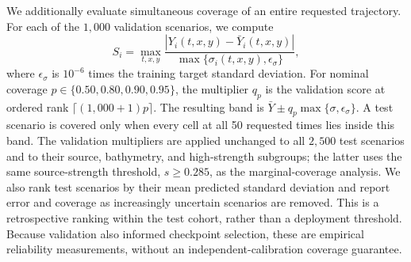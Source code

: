 We additionally evaluate simultaneous coverage of an entire requested trajectory. For each of the $1{,}000$ validation scenarios, we compute
\begin{equation}
S_i = \max_{t, x, y} \frac{|Y_i (t, x, y) - \bar{Y}_i(t, x, y)|}{\max\{\sigma_i(t, x, y), \epsilon_\sigma\}},
\end{equation}
where $\epsilon_\sigma$ is $10 ^ {-6}$ times the training target standard deviation. For nominal coverage $p\in\{0.50, 0.80, 0.90, 0.95\}$, the multiplier $q_p$ is the validation score at ordered rank $\lceil(1{,}000 + 1)p\rceil$. The resulting band is $\bar{Y}\pm q_p\max\{\sigma, \epsilon_\sigma\}$. A test scenario is covered only when every cell at all 50 requested times lies inside this band. The validation multipliers are applied unchanged to all $2{,}500$ test scenarios and to their source, bathymetry, and high-strength subgroups; the latter uses the same source-strength threshold, $s\geq0.285$, as the marginal-coverage analysis. We also rank test scenarios by their mean predicted standard deviation and report error and coverage as increasingly uncertain scenarios are removed. This is a retrospective ranking within the test cohort, rather than a deployment threshold. Because validation also informed checkpoint selection, these are empirical reliability measurements, without an independent-calibration coverage guarantee.

